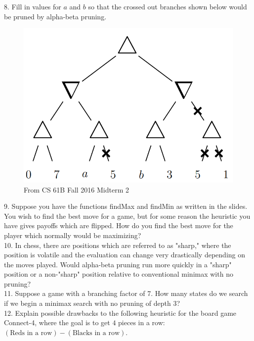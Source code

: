 \documentclass[12pt, letterpaper]{article}
\begin{document}
8. Fill in values for $a$ and $b$ so that the crossed out branches shown below would be pruned by alpha-beta pruning.
\begin{figure}[H]
    \centering
    \includegraphics[scale=0.3]{alpha-beta-prob.png}
    \caption*{From CS 61B Fall 2016 Midterm 2}
\end{figure}


9. Suppose you have the functions findMax and findMin as written in the slides. You wish to find the best move for a game, but for some reason the heuristic you have gives payoffs which are flipped. How do you find the best move for the player which normally would be maximizing? \\

10. In chess, there are positions which are referred to as "sharp," where the position is volatile and the evaluation can change very drastically depending on the moves played. Would alpha-beta pruning run more quickly in a "sharp" position or a non-"sharp" position relative to conventional minimax with no pruning? \\

11. Suppose a game with a branching factor of 7. How many states do we search if we begin a minimax search with no pruning of depth 3? \\

12. Explain possible drawbacks to the following heuristic for the board game Connect-4, where the goal is to get $4$ pieces in a row: $(\text{Reds in a row}) - (\text{Blacks in a row})$.
\end{document}
